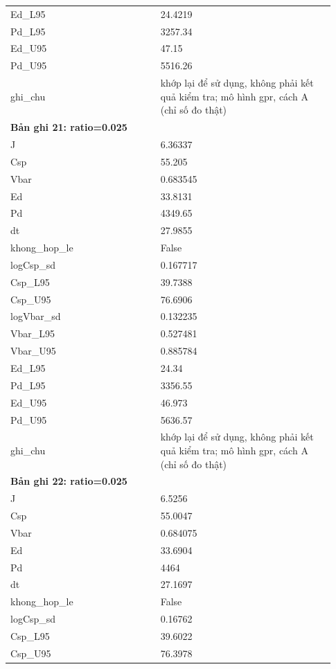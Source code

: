 \begin{longtable}{p{0.43\linewidth}p{0.50\linewidth}}
Ed\_\allowbreak L95 & 24.4219 \\
Pd\_\allowbreak L95 & 3257.34 \\
Ed\_\allowbreak U95 & 47.15 \\
Pd\_\allowbreak U95 & 5516.26 \\
ghi\_\allowbreak chu & khớp lại để sử dụng, không phải kết quả kiểm tra; mô hình gpr, cách A (chỉ số đo thật) \\
\midrule
\multicolumn{2}{p{0.95\linewidth}}{\textbf{Bản ghi 21: ratio=0.025}} \\
J & 6.36337 \\
Csp & 55.205 \\
Vbar & 0.683545 \\
Ed & 33.8131 \\
Pd & 4349.65 \\
dt & 27.9855 \\
khong\_\allowbreak hop\_\allowbreak le & False \\
logCsp\_\allowbreak sd & 0.167717 \\
Csp\_\allowbreak L95 & 39.7388 \\
Csp\_\allowbreak U95 & 76.6906 \\
logVbar\_\allowbreak sd & 0.132235 \\
Vbar\_\allowbreak L95 & 0.527481 \\
Vbar\_\allowbreak U95 & 0.885784 \\
Ed\_\allowbreak L95 & 24.34 \\
Pd\_\allowbreak L95 & 3356.55 \\
Ed\_\allowbreak U95 & 46.973 \\
Pd\_\allowbreak U95 & 5636.57 \\
ghi\_\allowbreak chu & khớp lại để sử dụng, không phải kết quả kiểm tra; mô hình gpr, cách A (chỉ số đo thật) \\
\midrule
\multicolumn{2}{p{0.95\linewidth}}{\textbf{Bản ghi 22: ratio=0.025}} \\
J & 6.5256 \\
Csp & 55.0047 \\
Vbar & 0.684075 \\
Ed & 33.6904 \\
Pd & 4464 \\
dt & 27.1697 \\
khong\_\allowbreak hop\_\allowbreak le & False \\
logCsp\_\allowbreak sd & 0.16762 \\
Csp\_\allowbreak L95 & 39.6022 \\
Csp\_\allowbreak U95 & 76.3978 \\

\end{longtable}
